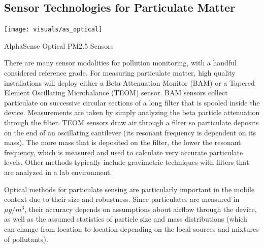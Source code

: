 \subsection{Sensor Technologies for Particulate Matter}

\begin{marginfigure}[3.5cm]
 	\texttt{[image: visuals/as\_optical]}               
 	 \caption{AlphaSense Optical PM2.5 Sensors}
  	\label{fig:as_optical}
\end{marginfigure}

There are many sensor modalities for pollution monitoring, with a handful considered reference grade.  For measuring particulate matter, high quality installations will deploy either a Beta Attenuation Monitor (BAM) or a Tapered Element Oscillating Microbalance (TEOM) sensor.  BAM sensors collect particulate on successive circular sections of a long filter that is spooled inside the device.  Measurements are taken by simply analyzing the beta particle attenuation through the filter.  TEOM sensors draw air through a filter so particulate deposits on the end of an oscillating cantilever (its resonant frequency is dependent on its mass).  The more mass that is deposited on the filter, the lower the resonant frequency, which is measured and used to calculate very accurate particulate levels.  Other methods typically include gravimetric techniques with filters that are analyzed in a lab environment. \cite{dep1999}

Optical methods for particulate sensing are particularly important in the mobile context due to their size and robustness.  Since particulates are measured in \(\mu g/m^3\), their accuracy depends on assumptions about airflow through the device, as well as the assumed statistics of particle size and mass distributions (which can change from location to location depending on the local sources and mixtures of pollutants).  

